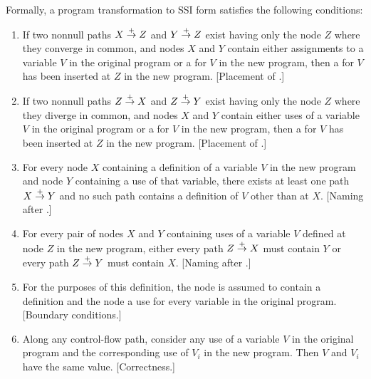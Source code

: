 \documentclass[12pt,titlepage,twoside]{article}
\begin{document}
Formally, a program transformation to SSI form satisfies the following
conditions:
\begin{enumerate}
\item If two nonnull paths $X \stackrel{+}{\rightarrow} Z$ and $Y \stackrel{+}{\rightarrow} Z$
exist having only the node $Z$ where they converge in common,
and nodes $X$ and $Y$ contain either assignments to a variable $V$ in the
original program or a \phisigfunction[or]{} for $V$ in the new program,
then a \phifunction{} for $V$ has been inserted at $Z$ in the new program.
[Placement of .] \label{crit_phiplace}

\item If two nonnull paths $Z \stackrel{+}{\rightarrow} X$ and $Z \stackrel{+}{\rightarrow} Y$
exist having only the node $Z$ where they diverge in common,
and nodes $X$ and $Y$ contain either uses of a variable $V$ in the
original program or a \phisigfunction[or]{} for $V$ in the new program,
then a \sigfunction{} for $V$ has been inserted at $Z$ in the new program.
[Placement of .] \label{crit_sigplace}

\item For every node $X$ containing a definition of a variable $V$ in
the new program and node $Y$ containing a use of that variable, there
exists at least one path $X \stackrel{+}{\rightarrow} Y$ and no such path contains a
definition of $V$ other than at $X$. %
[Naming after .] \label{crit_phiname}

\item For every pair of nodes $X$ and $Y$ containing uses of a
variable $V$ defined at node $Z$ in the new program, either every path
$Z \stackrel{+}{\rightarrow} X$ must contain $Y$ or every path $Z \stackrel{+}{\rightarrow} Y$ must
contain $X$.
[Naming after .] \label{crit_signame}

\item For the purposes of this definition, the  node
is assumed to contain a definition and the  node a use for every
variable in the original program.
[Boundary conditions.] \label{crit_boundary}

\item Along any control-flow path, consider any use of a variable $V$
in the original program and the corresponding use of $V_i$ in the new
program.  Then $V$ and $V_i$ have the same value.
[Correctness.] \label{crit_correct}
\end{enumerate}
\end{document}
